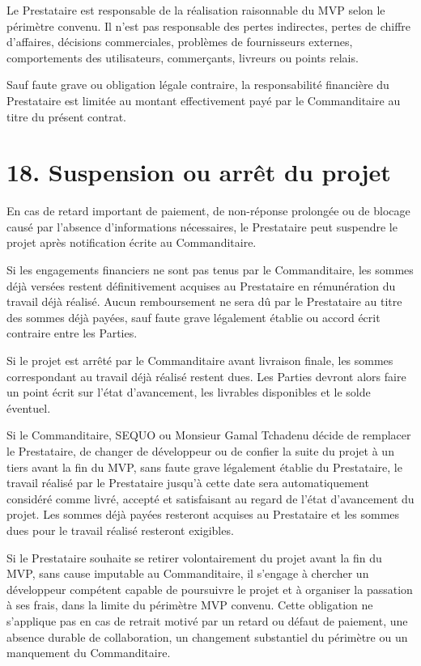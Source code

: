 \documentclass[11pt,a4paper]{article}
\begin{document}
Le Prestataire est responsable de la réalisation raisonnable du MVP selon le périmètre convenu. Il n'est pas responsable des pertes indirectes, pertes de chiffre d'affaires, décisions commerciales, problèmes de fournisseurs externes, comportements des utilisateurs, commerçants, livreurs ou points relais.

Sauf faute grave ou obligation légale contraire, la responsabilité financière du Prestataire est limitée au montant effectivement payé par le Commanditaire au titre du présent contrat.

\section*{18. Suspension ou arrêt du projet}

En cas de retard important de paiement, de non-réponse prolongée ou de blocage causé par l'absence d'informations nécessaires, le Prestataire peut suspendre le projet après notification écrite au Commanditaire.

Si les engagements financiers ne sont pas tenus par le Commanditaire, les sommes déjà versées restent définitivement acquises au Prestataire en rémunération du travail déjà réalisé. Aucun remboursement ne sera dû par le Prestataire au titre des sommes déjà payées, sauf faute grave légalement établie ou accord écrit contraire entre les Parties.

Si le projet est arrêté par le Commanditaire avant livraison finale, les sommes correspondant au travail déjà réalisé restent dues. Les Parties devront alors faire un point écrit sur l'état d'avancement, les livrables disponibles et le solde éventuel.

Si le Commanditaire, SEQUO ou Monsieur Gamal Tchadenu décide de remplacer le Prestataire, de changer de développeur ou de confier la suite du projet à un tiers avant la fin du MVP, sans faute grave légalement établie du Prestataire, le travail réalisé par le Prestataire jusqu'à cette date sera automatiquement considéré comme livré, accepté et satisfaisant au regard de l'état d'avancement du projet. Les sommes déjà payées resteront acquises au Prestataire et les sommes dues pour le travail réalisé resteront exigibles.

Si le Prestataire souhaite se retirer volontairement du projet avant la fin du MVP, sans cause imputable au Commanditaire, il s'engage à chercher un développeur compétent capable de poursuivre le projet et à organiser la passation à ses frais, dans la limite du périmètre MVP convenu. Cette obligation ne s'applique pas en cas de retrait motivé par un retard ou défaut de paiement, une absence durable de collaboration, un changement substantiel du périmètre ou un manquement du Commanditaire.
\end{document}
